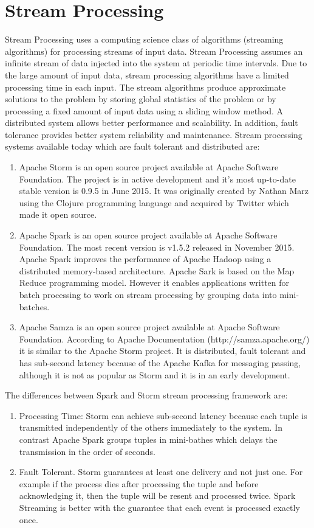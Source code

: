 \documentclass{lmproj}
\begin{document}
\section{Stream Processing}
\label{relatedwork}

Stream Processing uses a computing science class of algorithms (streaming algorithms) for processing streams of input data. Stream Processing assumes an infinite stream of data injected into the system at periodic time intervals. Due to the large amount of input data, stream processing algorithms have a limited processing time in each input.  The stream algorithms produce approximate solutions to the problem by storing global statistics of the problem or by processing a fixed amount of input data using a sliding window method.
A distributed system allows better performance and scalability. In addition, fault tolerance provides better system reliability and maintenance. Stream processing systems available today which are fault tolerant and distributed are:

\begin{enumerate}
	\item Apache Storm is an open source project available at Apache Software Foundation. The project is in active development and it’s most up-to-date stable version is 0.9.5 in June 2015. It was originally created by Nathan Marz using the Clojure programming language and acquired by Twitter which made it open source. 
	\item Apache Spark is an open source project available at Apache Software Foundation. The most recent version is v1.5.2 released in November 2015. Apache Spark improves the performance of Apache Hadoop using a distributed memory-based architecture. Apache Sark is based on the Map Reduce programming model. However it enables applications written for batch processing to work on stream processing by grouping data into mini-batches.
	\item Apache Samza is an open source project available at Apache Software Foundation. According to Apache Documentation (http://samza.apache.org/) it is similar to the Apache Storm project. It is distributed, fault tolerant and has sub-second latency because of the Apache Kafka for messaging passing, although it is not as popular as Storm and it is in an early development.
\end{enumerate}

The differences between Spark and Storm stream processing framework are:

\begin{enumerate}
	\item Processing Time: Storm can achieve sub-second latency because each tuple is transmitted independently of the others immediately to the system. In contrast Apache Spark groups tuples in mini-bathes which delays the transmission in the order of seconds.
	\item Fault Tolerant. Storm guarantees at least one delivery and not just one. For example if the process dies after processing the tuple and before acknowledging it, then the tuple will be resent and processed twice. Spark Streaming is better with the guarantee that each event is processed exactly once.  
\end{enumerate}
\end{document}
